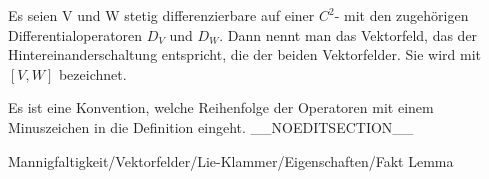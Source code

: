 {}
{

Es seien
\mathkor {} {V} {und} {W} {}
stetig differenzierbare
auf einer
$C^2$-
mit den zugehörigen Differentialoperatoren $D_V$ und $D_W$. Dann nennt man das Vektorfeld, das der Hintereinanderschaltung
 entspricht, die
der beiden Vektorfelder. Sie wird mit $[V,W]$ bezeichnet.

}

Es ist eine Konvention, welche Reihenfolge der Operatoren mit einem Minuszeichen in die Definition eingeht.
__NOEDITSECTION__

{Mannigfaltigkeit/Vektorfelder/Lie-Klammer/Eigenschaften/Fakt}
{Lemma}
{}
{

\faktzusatz {}
\faktzusatz {}

}
